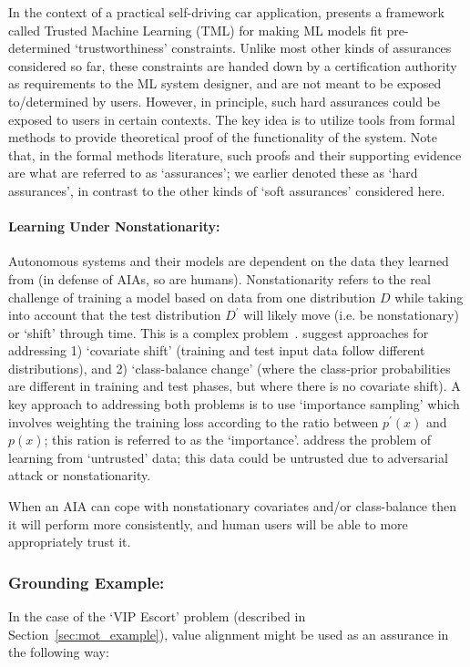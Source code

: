 In the context of a practical self-driving car application, \citet{Ghosh2016-dl} presents a framework called Trusted Machine Learning (TML) for making ML models fit pre-determined `trustworthiness' constraints. Unlike most other kinds of assurances considered so far, these constraints are handed down by a certification authority as requirements to the ML system designer, and are not meant to be exposed to/determined by users. However, in principle, such hard assurances could be exposed to users in certain contexts. The key idea is to utilize tools from formal methods to provide theoretical proof of the functionality of the system. Note that, in the formal methods literature, such proofs and their supporting evidence are what are referred to as `assurances'; we earlier denoted these as `hard assurances', in contrast to the other kinds of `soft assurances' considered here. 

\paragraph{Learning Under Nonstationarity:}
Autonomous systems and their models are dependent on the data they learned from (in defense of AIAs, so are humans). Nonstationarity refers to the real challenge of training a model based on data from one distribution $D$ while taking into account that the test distribution $D^\prime$ will likely move (i.e. be nonstationary) or `shift' through time. This is a complex problem~\cite{Quinonero-Candela2009-fj}. \citet{Sugiyama2013-ci} suggest approaches for addressing 1) `covariate shift' (training and test input data follow different distributions), and 2) `class-balance change' (where the class-prior probabilities are different in training and test phases, but where there is no covariate shift). A key approach to addressing both problems is to use `importance sampling' which involves weighting the training loss according to the ratio between $p^\prime(x)$ and $p(x)$; this ration is referred to as the `importance'. \citet{Charikar2017-kr} address the problem of learning from `untrusted' data; this data could be untrusted due to adversarial attack or nonstationarity.

When an AIA can cope with nonstationary covariates and/or class-balance then it will perform more consistently, and human users will be able to more appropriately trust it.

\subsubsection{Grounding Example:}
In the case of the `VIP Escort' problem (described in Section~\ref{sec:mot_example}), value alignment might be used as an assurance in the following way:

